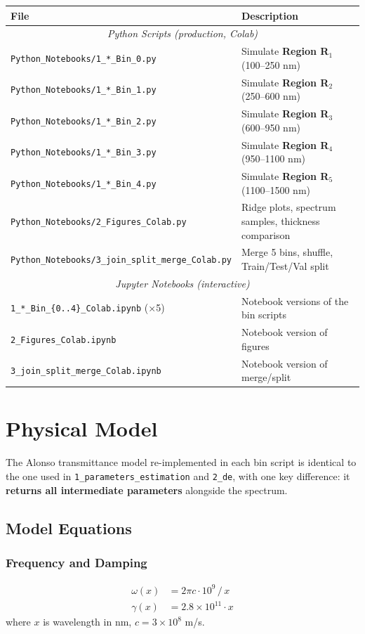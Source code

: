 \documentclass[11pt,a4paper]{article}
\begin{document}
\begin{longtable}{lp{10cm}}
\toprule
\textbf{File} & \textbf{Description} \\
\midrule
\multicolumn{2}{c}{\textit{Python Scripts (production, Colab)}} \\
\midrule
{\tt Python\_Notebooks/1\_*\_Bin\_0.py} & Simulate \textbf{Region R}$_1$ (100--250 nm) \\
{\tt Python\_Notebooks/1\_*\_Bin\_1.py} & Simulate \textbf{Region R}$_2$ (250--600 nm) \\
{\tt Python\_Notebooks/1\_*\_Bin\_2.py} & Simulate \textbf{Region R}$_3$ (600--950 nm) \\
{\tt Python\_Notebooks/1\_*\_Bin\_3.py} & Simulate \textbf{Region R}$_4$ (950--1100 nm) \\
{\tt Python\_Notebooks/1\_*\_Bin\_4.py} & Simulate \textbf{Region R}$_5$ (1100--1500 nm) \\
{\tt Python\_Notebooks/2\_Figures\_Colab.py} & Ridge plots, spectrum samples, thickness comparison \\
{\tt Python\_Notebooks/3\_join\_split\_merge\_Colab.py} & Merge 5 bins, shuffle, Train/Test/Val split \\
\midrule
\multicolumn{2}{c}{\textit{Jupyter Notebooks (interactive)}} \\
\midrule
{\tt 1\_*\_Bin\_\{0..4\}\_Colab.ipynb} (×5) & Notebook versions of the bin scripts \\
{\tt 2\_Figures\_Colab.ipynb} & Notebook version of figures \\
{\tt 3\_join\_split\_merge\_Colab.ipynb} & Notebook version of merge/split \\
\bottomrule
\end{longtable}

\section{Physical Model}

The Alonso transmittance model re-implemented in each bin script is identical to the one used in {\tt 1\_parameters\_estimation} and {\tt 2\_de}, with one key difference: it \textbf{returns all intermediate parameters} alongside the spectrum.

\subsection{Model Equations}

\subsubsection*{Frequency and Damping}
\begin{align*}
    \omega(x) &= 2\pi c \cdot 10^9 \,/\, x \\
    \gamma(x) &= 2.8 \times 10^{11} \cdot x
\end{align*}
where $x$ is wavelength in nm, $c = 3 \times 10^8$ m/s.
\end{document}
